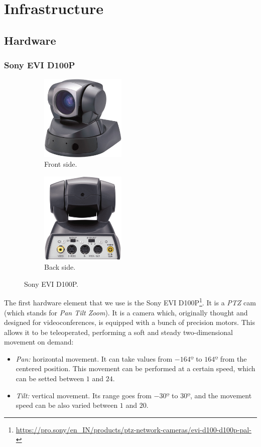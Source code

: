 \chapter{Infrastructure}

\section{Hardware}
	\subsection{Sony EVI D100P}
		\begin{figure}[h]
			\centering
			\begin{subfigure}[h]{0.4\linewidth}
				\centering
				\includegraphics[width=1.6in]{images/ptz_front}
				\caption{Front side.}
			\end{subfigure}
			\qquad
			\begin{subfigure}[h]{0.4\linewidth}
				\centering
				\includegraphics[width=1.6in]{images/ptz_back}
				\caption{Back side.}
			\end{subfigure}
			\caption{Sony EVI D100P.}
			\label{fig:3_evi}
		\end{figure} 
		
		The first hardware element that we use is the Sony EVI D100P\footnote{\url{https://pro.sony/en_IN/products/ptz-network-cameras/evi-d100-d100p-pal-}}. It is a \emph{PTZ} cam (which stands for \emph{Pan Tilt Zoom}). It is a camera which, originally thought and designed for videoconferences, is equipped with a bunch of precision motors. This allows it to be teleoperated, performing a soft and steady two-dimensional movement on demand:
		\begin{itemize}
			\item \emph{Pan:} horizontal movement. It can take values from $-164º$ to $164º$ from the centered position. This movement can be performed at a certain speed, which can be setted between $1$ and $24$.

			\item \emph{Tilt:} vertical movement. Its range goes from $-30º$ to $30º$, and the movement speed can be also varied between $1$ and $20$.
		\end{itemize}

